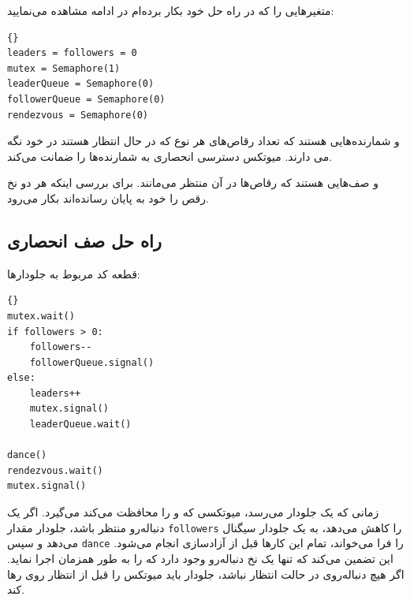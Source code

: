\documentclass{book}
\newcommand{\clearemptydoublepage}{\newpage\cleardoublepage}
\begin{document}
    متغیرهایی را که در راه حل خود بکار برده‌ام در ادامه مشاهده می‌نمایید:

\begin{latin}
\begin{latin}
\begin{lstlisting}[title={\rl{راهنمای صف}}]{}
leaders = followers = 0
mutex = Semaphore(1)
leaderQueue = Semaphore(0)
followerQueue = Semaphore(0)
rendezvous = Semaphore(0)
\end{lstlisting}
\end{latin}
\end{latin}

     و 
    شمارنده‌هایی هستند که تعداد رقاص‌های هر نوع که در حال انتظار هستند در خود نگه می دارند. 
    میوتکس دسترسی انحصاری به شمارنده‌ها را ضمانت می‌کند.

     و 
صف‌هایی هستند که رقاص‌ها در آن  منتظر می‌مانند. 
 برای بررسی اینکه هر دو نخ رقص را خود به پایان‌ رسانده‌اند بکار می‌رود. 


\clearemptydoublepage
\subsection {راه حل صف انحصاری}

    قطعه کد مربوط به جلو‌دارها:

\begin{latin}
\begin{latin}
\begin{lstlisting}[title=\rl{راه حل صف (جلودارها)}]{}
mutex.wait()
if followers > 0:
    followers--
    followerQueue.signal()
else:
    leaders++
    mutex.signal()
    leaderQueue.wait()    

dance()
rendezvous.wait()
mutex.signal()
\end{lstlisting}
\end{latin}
\end{latin}

    زمانی که یک جلو‌دار می‌رسد، میوتکسی که   و  را محافظت می‌کند می‌گیرد. 
    اگر یک دنباله‌رو منتظر باشد، جلو‌دار مقدار {\tt followers} را کاهش می‌دهد،  به یک جلو‌دار سیگنال می‌دهد و سپس {\tt dance} را فرا می‌خواند، 
    تمام این‌ کارها  قبل از آزادسازی  انجام می‌شود. 
    این تضمین می‌کند که تنها یک نخ دنباله‌رو وجود دارد که  را به طور همزمان اجرا نماید. 
    اگر هیچ دنباله‌روی در حالت انتظار نباشد، جلو‌دار باید میوتکس را قبل از انتظار روی  رها کند. 
\end{document}
